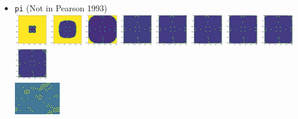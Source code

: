 \begin{itemize}
\item {\tt pi} (Not in Pearson 1993)\\
\includegraphics[height=1.4cm]{python_codes/fieldstone_171/pearson93_rand/pi_solution_0001000_u}
\includegraphics[height=1.4cm]{python_codes/fieldstone_171/pearson93_rand/pi_solution_0005000_u}
\includegraphics[height=1.4cm]{python_codes/fieldstone_171/pearson93_rand/pi_solution_0010000_u}
\includegraphics[height=1.4cm]{python_codes/fieldstone_171/pearson93_rand/pi_solution_0015000_u}
\includegraphics[height=1.4cm]{python_codes/fieldstone_171/pearson93_rand/pi_solution_0020000_u}
\includegraphics[height=1.4cm]{python_codes/fieldstone_171/pearson93_rand/pi_solution_0030000_u}
\includegraphics[height=1.4cm]{python_codes/fieldstone_171/pearson93_rand/pi_solution_0040000_u}
\includegraphics[height=1.4cm]{python_codes/fieldstone_171/pearson93_rand/pi_solution_0050000_u}
\includegraphics[height=1.4cm]{python_codes/fieldstone_171/pearson93_rand/pi_solution_final_u}\\
\includegraphics[height=1.4cm]{python_codes/fieldstone_171/images/munafo_pi}


\end{itemize}
